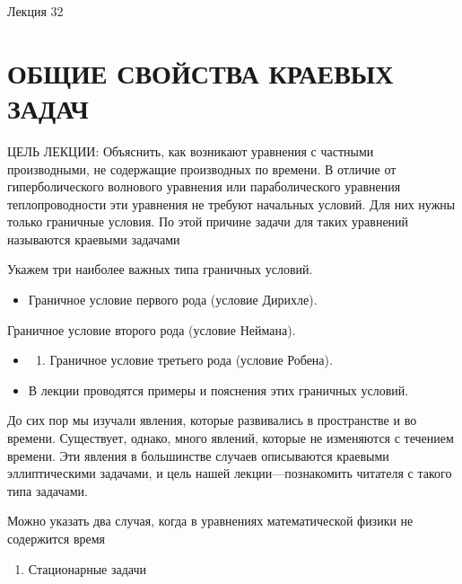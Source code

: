 \documentclass[
]{article}
\providecommand{\tightlist}{%
  \setlength{\itemsep}{0pt}\setlength{\parskip}{0pt}}
\begin{document}
Лекция 32

\section{ОБЩИЕ СВОЙСТВА КРАЕВЫХ
ЗАДАЧ}\label{ux43eux431ux449ux438ux435-ux441ux432ux43eux439ux441ux442ux432ux430-ux43aux440ux430ux435ux432ux44bux445-ux437ux430ux434ux430ux447}

ЦЕЛЬ ЛЕКЦИИ: Объяснить, как возникают уравнения с частными производными,
не содержащие производных по времени. В отличие от гиперболического
волнового уравнения или параболического уравнения теплопроводности эти
уравнения не требуют начальных условий. Для них нужны только граничные
условия. По этой причине задачи для таких уравнений называются краевыми
задачами

Укажем три наиболее важных типа граничных условий.

\begin{itemize}
\tightlist
\item
  Граничное условие первого рода (условие Дирихле).
\end{itemize}

Граничное условие второго рода (условие Неймана).

\begin{itemize}
\tightlist
\item
  \begin{enumerate}
  \def\labelenumi{\arabic{enumi}.}
  \setcounter{enumi}{2}
  \tightlist
  \item
    Граничное условие третьего рода (условие Робена).
  \end{enumerate}
\item
  В лекции проводятся примеры и пояснения этих граничных условий.
\end{itemize}

До сих пор мы изучали явления, которые развивались в пространстве и во
времени. Существует, однако, много явлений, которые не изменяются с
течением времени. Эти явления в большинстве случаев описываются краевыми
эллиптическими задачами, и цель нашей лекции---познакомить читателя с
такого типа задачами.

Можно указать два случая, когда в уравнениях математической физики не
содержится время

\begin{enumerate}
\def\labelenumi{\arabic{enumi}.}
\tightlist
\item
  Стационарные задачи
\end{enumerate}
\end{document}
